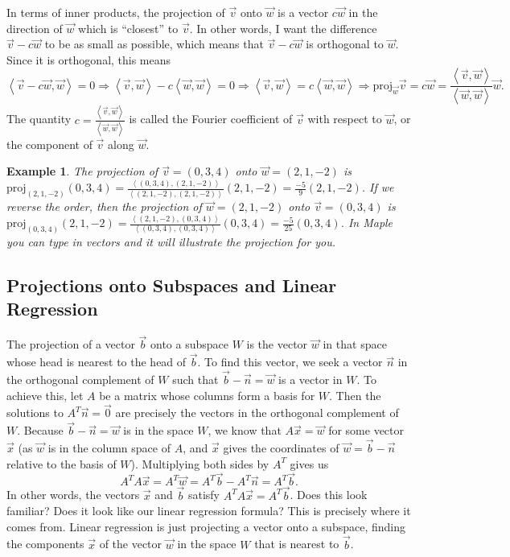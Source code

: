 \documentclass[10pt]{article}
\theoremstyle{plain}
\theoremstyle{box}
\newtheorem{example}{Example}
\newcommand{\ds}{\displaystyle}
\begin{document}
In terms of inner products, the projection of $\vec v$ onto $\vec w$ is a vector $c\vec w$ in the direction of $\vec w$ which is ``closest'' to $\vec v$. In other words, I want the difference $\vec v-c\vec w$ to be as small as possible, which means that $\vec v-c\vec w$ is orthogonal to $\vec w$.  Since it is orthogonal, this means 
$$\left<\vec v-c\vec w,\vec w\right>=0\Rightarrow 
\left<\vec v,\vec w\right>-c\left<\vec w,\vec w\right>=0 \Rightarrow 
\left<\vec v,\vec w\right>=c\left<\vec w,\vec w\right> \Rightarrow 
\text{proj}_{\vec w}\vec v = c\vec w=\frac{\left<\vec v,\vec w\right>}{\left<\vec w,\vec w\right>}\vec w.
$$ The quantity $c=\frac{\left<\vec v,\vec w\right>}{\left<\vec w,\vec w\right>}$ is called the Fourier coefficient of $\vec v$ with respect to $\vec w$, or the component of $\vec v$ along $\vec w$.

\begin{example}
The projection of $\vec v = (0,3,4)$ onto $\vec w = (2,1,-2)$ is 
$\ds \text{proj}_{(2,1,-2)}(0,3,4) =\frac{\left<(0,3,4),(2,1,-2)\right>}{\left<(2,1,-2),(2,1,-2)\right>}(2,1,-2) = \frac{-5}{9}(2,1,-2)$. If we reverse the order, then the projection of $\vec w = (2,1,-2)$  onto $\vec v = (0,3,4)$ is 
$\ds \text{proj}_{(0,3,4)}(2,1,-2) =\frac{\left<(2,1,-2),(0,3,4)\right>}{\left<(0,3,4),(0,3,4)\right>}(0,3,4) = \frac{-5}{25}(0,3,4)$. In Maple you can type in vectors and it will illustrate the projection for you.
\end{example}

\subsection{Projections onto Subspaces and Linear Regression}

The projection of a vector $\vec b$ onto a subspace $W$ is the vector $\vec w$ in that space whose head is nearest to the head of $\vec b$. To find this vector, we seek a vector $\vec n$ in the orthogonal complement of $W$ such that $\vec b-\vec n=\vec w$ is a vector in $W$. To achieve this, let $A$ be a matrix whose columns form a basis for $W$.  Then the solutions to $A^T\vec n=\vec 0$ are precisely the vectors in the orthogonal complement of $W$. 
Because $\vec b-\vec n=\vec w$ is in the space $W$, we know that $A\vec x = \vec w$ for some vector $\vec x$ (as $\vec w$ is in the column space of $A$, and $\vec x$ gives the coordinates of $\vec w = \vec b-\vec n$ relative to the basis of $W$). Multiplying both sides by $A^T$ gives us $$A^T A \vec x = A^T\vec w =A^T\vec b - A^T\vec n = A^T\vec b.$$ In other words, the vectors $\vec x$ and $\vec b$ satisfy $A^T A \vec x = A^T \vec b$.  Does this look familiar? Does it look like our linear regression formula? This is precisely where it comes from. Linear regression is just projecting a vector onto a subspace, finding the components $\vec x$ of the vector $\vec w$ in the space $W$ that is nearest to $\vec b$.
\end{document}
